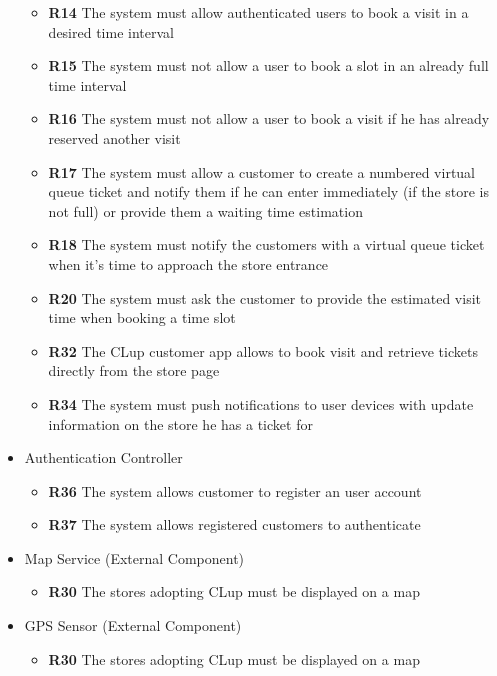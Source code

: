 \begin{itemize}
\begin{itemize}
        \item \textbf{R14} The system must allow authenticated users to book a visit in a desired time interval
        \item \textbf{R15} The system must not allow a user to book a slot in an already full time interval
        \item \textbf{R16} The system must not allow a user to book a visit if he has already reserved another visit
        \item \textbf{R17} The system must allow a customer to create a numbered virtual queue ticket and notify them if he can enter immediately (if the store is not full) or provide them a waiting time estimation
        \item \textbf{R18} The system must notify the customers with a virtual queue ticket when it’s time to approach the store entrance
        \item \textbf{R20} The system must ask the customer to provide the estimated visit time when booking a time slot
        \item \textbf{R32} The CLup customer app allows to book visit and retrieve tickets directly from the store page
        \item \textbf{R34} The system must push notifications to user devices with update information on the store he has a ticket for 
    \end{itemize}
    \item Authentication Controller
    \begin{itemize}
        \item \textbf{R36} The system allows customer to register an user account
        \item \textbf{R37} The system allows registered customers to authenticate
    \end{itemize}
    \item Map Service (External Component)
    \begin{itemize}
        \item \textbf{R30} The stores adopting CLup must be displayed on a map   
    \end{itemize}
    \item GPS Sensor (External Component)
    \begin{itemize}
        \item \textbf{R30} The stores adopting CLup must be displayed on a map   
    \end{itemize}
\end{itemize}

